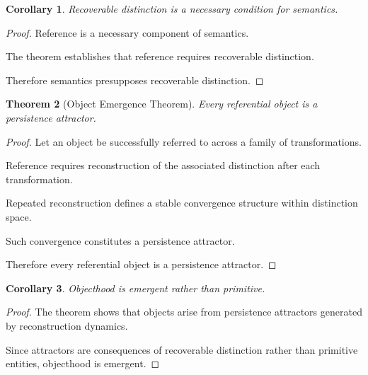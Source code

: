 \documentclass[12pt,oneside]{article}
\newtheorem{theorem}{Theorem}[section] \newtheorem{lemma}[theorem]{Lemma} \newtheorem{proposition}[theorem]{Proposition} \newtheorem{corollary}[theorem]{Corollary}
\theoremstyle{definition}
\begin{document}
\begin{corollary}

Recoverable distinction is a necessary condition for semantics.

\end{corollary}

\begin{proof}

Reference is a necessary component of semantics.

The theorem establishes that reference requires recoverable distinction.

Therefore semantics presupposes recoverable distinction.

\end{proof}

\begin{theorem}[Object Emergence Theorem]

Every referential object is a persistence attractor.

\end{theorem}

\begin{proof}

Let an object be successfully referred to across a family of transformations.

Reference requires reconstruction of the associated distinction after each transformation.

Repeated reconstruction defines a stable convergence structure within distinction space.

Such convergence constitutes a persistence attractor.

Therefore every referential object is a persistence attractor.

\end{proof}

\begin{corollary}

Objecthood is emergent rather than primitive.

\end{corollary}

\begin{proof}

The theorem shows that objects arise from persistence attractors generated by reconstruction dynamics.

Since attractors are consequences of recoverable distinction rather than primitive entities, objecthood is emergent.

\end{proof}
\end{document}
